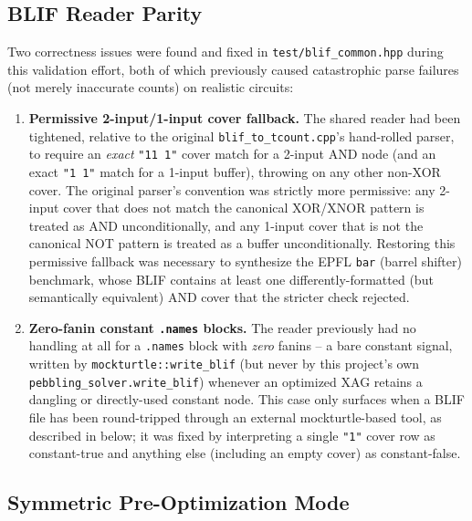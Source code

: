 \subsection{BLIF Reader Parity}

Two correctness issues were found and fixed in
\texttt{test/blif\_common.hpp} during this validation effort, both of
which previously caused catastrophic parse failures (not merely
inaccurate counts) on realistic circuits:

\begin{enumerate}
\item \textbf{Permissive 2-input/1-input cover fallback.} The shared
  reader had been tightened, relative to the original
  \texttt{blif\_to\_tcount.cpp}'s hand-rolled parser, to require an
  \emph{exact} \texttt{"11 1"} cover match for a 2-input AND node
  (and an exact \texttt{"1 1"} match for a 1-input buffer), throwing
  on any other non-XOR cover. The original parser's convention was
  strictly more permissive: any 2-input cover that does not match the
  canonical XOR/XNOR pattern is treated as AND unconditionally, and
  any 1-input cover that is not the canonical NOT pattern is treated
  as a buffer unconditionally. Restoring this permissive fallback was
  necessary to synthesize the EPFL \texttt{bar} (barrel shifter)
  benchmark, whose BLIF contains at least one differently-formatted
  (but semantically equivalent) AND cover that the stricter check
  rejected.
\item \textbf{Zero-fanin constant \texttt{.names} blocks.} The reader
  previously had no handling at all for a \texttt{.names} block with
  \emph{zero} fanins -- a bare constant signal, written by
  \texttt{mockturtle::write\_blif} (but never by this project's own
  \texttt{pebbling\_solver.write\_blif}) whenever an optimized XAG
  retains a dangling or directly-used constant node. This case only
  surfaces when a BLIF file has been round-tripped through an
  external mockturtle-based tool, as described in
   below; it was fixed by interpreting a
  single \texttt{"1"} cover row as constant-true and anything else
  (including an empty cover) as constant-false.
\end{enumerate}

\subsection{Symmetric Pre-Optimization Mode}
\label{sec-pre-optimize}

